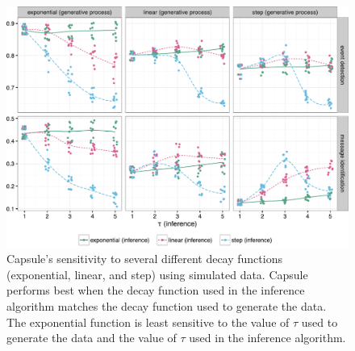 \begin{figure}[ht]
\centering
\includegraphics[width=\linewidth]{fig/sim_sensitivity.pdf}
\caption{Capsule's sensitivity to several different decay functions
(exponential, linear, and step) using simulated data. Capsule performs
best when the decay function used in the inference algorithm matches
the decay function used to generate the data. The exponential function
is least sensitive to the value of $\tau$ used to generate the data
and the value of $\tau$ used in the inference algorithm.}
\label{fig:sensitivity}
\end{figure}












